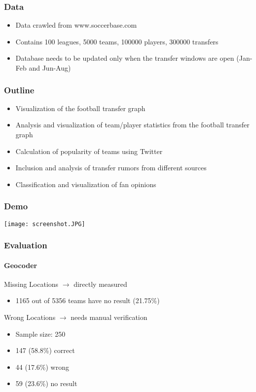 \documentclass{beamer}
\begin{document}
	\begin{frame}
    \frametitle{Data}
		\begin{itemize}
      \item Data crawled from www.soccerbase.com
			\item Contains 100 leagues, 5000 teams, 100000 players, 300000 transfers
			\item Database needs to be updated only when the transfer windows are open (Jan-Feb and Jun-Aug)
		\end{itemize}
  \end{frame}
	
	\begin{frame}
    \frametitle{Outline}
		\begin{itemize}
      \item Visualization of the football transfer graph \checkmark
			\item Analysis and visualization of team/player statistics from the football transfer graph 
			\item Calculation of popularity of teams using Twitter 
			\item Inclusion and analysis of transfer rumors from different sources \checkmark
			\item Classification and visualization of fan opinions \checkmark
		\end{itemize}
  \end{frame}
	
	\begin{frame}
    \frametitle{Demo}
		\begin{center}
      \texttt{[image: screenshot.JPG]}\\
			\end{center}
  \end{frame}
	
	\begin{frame}
    \frametitle{Evaluation}
		\framesubtitle{Geocoder}
		\begin{block}{Missing Locations}
			$\rightarrow$ directly measured
			\begin{itemize}
      \item 1165 out of 5356 teams have no result (21.75\%)
			\end{itemize}
		\end{block}
	  \begin{block}{Wrong Locations}
			$\rightarrow$ needs manual verification
			\begin{itemize}
			\item Sample size: 250
      \item 147 (58.8\%) correct
			\item 44 (17.6\%) wrong 
			\item 59 (23.6\%) no result
			\end{itemize}
    \end{block}
  \end{frame}
	
\end{document}
